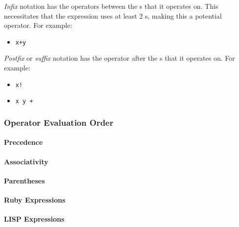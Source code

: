 \begin{definition}[Infix]\label{def:Fixity-Infix}
  \emph{Infix} notation has the operators between the s that it operates on.
  This necessitates that the expression uses at least 2 s, making this a potential  operator.
  For example:
  \begin{itemize}[noitemsep]
  \item \texttt{x+y}
  \end{itemize}
\end{definition}

\begin{definition}[Suffix]\label{def:Fixity-Suffix}
  \emph{Postfix} or \emph{suffix} notation has the operator after the s that it operates on.
  For example:
  \begin{itemize}[noitemsep]
  \item \texttt{x!}
  \item \texttt{x y +}
  \end{itemize}
\end{definition}

\subsubsection{Operator Evaluation Order}\label{subsubsec:Operator_Evaluation_Order}
\paragraph{Precedence}\label{par:Operator_Evaluation_Order-Precedence}
\paragraph{Associativity}\label{par:Operator_Evaluation_Order-Associativity}
\paragraph{Parentheses}\label{par:Operator_Evaluation_Order-Parentheses}
\paragraph{Ruby Expressions}\label{par:Operator_Evaluation_Order-Ruby_Expressions}
\paragraph{LISP Expressions}\label{par:Operator_Evaluation_Order-LISP_Expressions}
